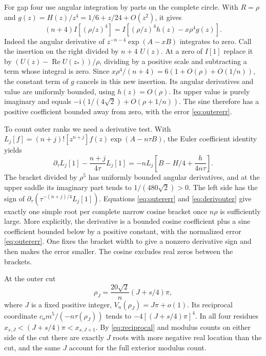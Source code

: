 \documentclass[11pt]{article}
\DeclareMathOperator{\Rea}{Re}
\newcommand{\ii}{\mathrm i}
\begin{document}
For gap four use angular integration by parts on the complete circle. With \(R=\rho\) and \(g(z)=H(z)/z^4=1/6+z/24+O(z^2)\), it gives
\begin{equation}
 (n+4) I[(\rho/z)^4]
   = I[(\rho/z)^4h(z)-x\rho^4g(z)] .
 \label{eq:lagfour}
\end{equation}
Indeed the angular derivative of \(z^{-n-4}\exp(A-xB)\) integrates to zero. Call the insertion on the right divided by \(n+4\) \(U(z)\). At a zero of \(I[1]\) replace it by \((U(z)-\Rea U(z_*))/\rho\), dividing by a positive scale and subtracting a term whose integral is zero. Since \(x\rho^4/(n+4)=6(1+O(\rho)+O(1/n))\), the constant term of \(g\) cancels in this new insertion. Its angular derivatives and value are uniformly bounded, using \(h(z)=O(\rho)\). Its upper value is purely imaginary and equals
\(-\ii(1/(4\sqrt2)+O(\rho+1/n))\). The sine therefore has a positive coefficient bounded away from zero, with the error \eqref{eq:outererr}.

To count outer ranks we need a derivative test. With
\(L_j[f]=(n+j)![z^{n+j}]f(z)\exp(A-n\tau B)\), the Euler coefficient identity yields
\begin{equation}
 \partial_\tau L_j[1]-\frac{n+j}{4\tau}L_j[1]
 =-n L_j\!\left[B-H/4+\frac{h}{4n\tau}\right].
 \label{eq:derivouter}
\end{equation}
The bracket divided by \(\rho^5\) has uniformly bounded angular derivatives, and at the upper saddle its imaginary part tends to \(1/(480\sqrt2)>0\). The left side has the sign of \(\partial_\tau(\tau^{-(n+j)/4}L_j[1])\). Equations \eqref{eq:outererr} and \eqref{eq:derivouter} give exactly one simple root per complete narrow cosine bracket once \(n\rho\) is sufficiently large. More explicitly, the derivative is a bounded cosine coefficient plus a sine coefficient bounded below by a positive constant, with the normalized error \eqref{eq:outererr}. One fixes the bracket width to give a nonzero derivative sign and then makes the error smaller. The cosine excludes real zeros between the brackets.

At the outer cut
\[
 \rho_J=\frac{20\sqrt2}{n}(J+s/4)\pi ,
\]
where \(J\) is a fixed positive integer, \(V_n(\rho_J)=J\pi+o(1)\). Its reciprocal coordinate \(c_{\mathrm o}m^5/(-n\tau(\rho_J))\) tends to \(-4[(J+s/4)\pi]^4\). In all four residues \(x_{s,J}<(J+s/4)\pi<x_{s,J+1}\). By \eqref{eq:reciprocal} and modulus counts on either side of the cut there are exactly \(J\) roots with more negative real location than the cut, and the same \(J\) account for the full exterior modulus count.
\end{document}
